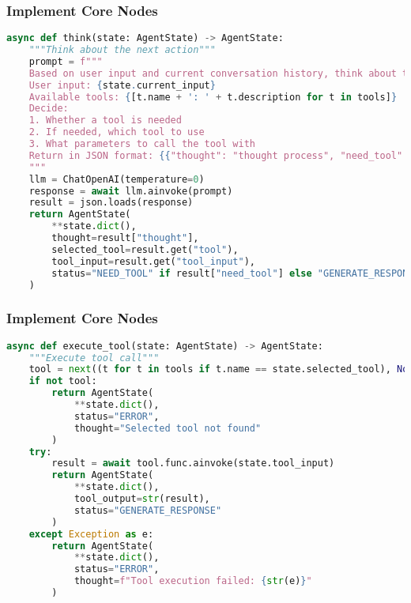 \begin{frame}[fragile]\frametitle{Implement Core Nodes}
\begin{lstlisting}[language=Python, basicstyle=\tiny]
async def think(state: AgentState) -> AgentState:
    """Think about the next action"""
    prompt = f"""
    Based on user input and current conversation history, think about the next action.
    User input: {state.current_input}
    Available tools: {[t.name + ': ' + t.description for t in tools]}
    Decide:
    1. Whether a tool is needed
    2. If needed, which tool to use
    3. What parameters to call the tool with
    Return in JSON format: {{"thought": "thought process", "need_tool": true/false, "tool": "tool name", "tool_input": "parameters"}}
    """
    llm = ChatOpenAI(temperature=0)
    response = await llm.ainvoke(prompt)
    result = json.loads(response)
    return AgentState(
        **state.dict(),
        thought=result["thought"],
        selected_tool=result.get("tool"),
        tool_input=result.get("tool_input"),
        status="NEED_TOOL" if result["need_tool"] else "GENERATE_RESPONSE"
    )
\end{lstlisting}

\end{frame}

\begin{frame}[fragile]\frametitle{Implement Core Nodes}
\begin{lstlisting}[language=Python, basicstyle=\tiny]
async def execute_tool(state: AgentState) -> AgentState:
    """Execute tool call"""
    tool = next((t for t in tools if t.name == state.selected_tool), None)
    if not tool:
        return AgentState(
            **state.dict(),
            status="ERROR",
            thought="Selected tool not found"
        )
    try:
        result = await tool.func.ainvoke(state.tool_input)
        return AgentState(
            **state.dict(),
            tool_output=str(result),
            status="GENERATE_RESPONSE"
        )
    except Exception as e:
        return AgentState(
            **state.dict(),
            status="ERROR",
            thought=f"Tool execution failed: {str(e)}"
        )
\end{lstlisting}

\end{frame}


